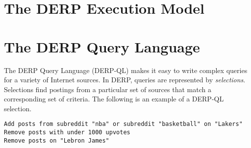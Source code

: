 \documentclass{article}
\begin{document}
\newpage
\section{\textbf{The DERP Execution Model}}






\newpage
\section{\textbf{The DERP Query Language}}
The DERP Query Language (DERP-QL) makes it easy to write complex queries for a variety of Internet sources. In DERP, queries are represented by \textit{selections}. Selections find postings from a particular set of sources that match a corresponding set of criteria. The following is an example of a DERP-QL selection.

\begin{lstlisting}
Add posts from subreddit "nba" or subreddit "basketball" on "Lakers"
Remove posts with under 1000 upvotes
Remove posts on "Lebron James"
\end{lstlisting}






\end{document}
